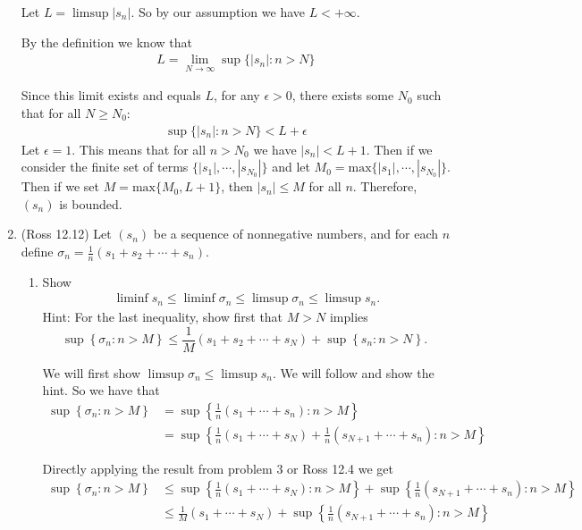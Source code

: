 \documentclass [10pt]{article}
\newcommand{\jg}[1]{{\color{blue} #1}}
\begin{document}
\begin{enumerate}
{Let $L = \limsup |s_n|$. So by our assumption we have $L < + \infty$. 

By the definition we know that
\begin{align*}
L = \lim_{N \rightarrow \infty} \sup \{ |s_n| : n > N \}
\end{align*}

Since this limit exists and equals $L$, for any $\epsilon > 0$, there exists some $N_0$ such that for all $N \geq N_0$: 
\begin{align*}
    \sup \{|s_n| : n > N \} < L + \epsilon
\end{align*}
Let $\epsilon = 1$. This means that for all $n > N_0$ we have $|s_n| < L+1$. Then if we consider the finite set of terms $\{ |s_1|, \cdots, |s_{N_0}|\}$ and let $M_0 = \text{max}\{ |s_1|, \cdots, |s_{N_0}|\}$. Then if we set $M = \text{max} \{M_0, L+1\}$, then $|s_n| \leq M$ for all $n$. Therefore, $(s_n)$ is bounded. 

}

\clearpage
\item (Ross 12.12) Let $\left(s_n\right)$ be a sequence of nonnegative numbers,
and for each $n$ define $\sigma_n=\frac{1}{n}\left(s_1+s_2+\cdots+s_n\right)$.
\begin{enumerate}
\item Show
\begin{align*}
\liminf s_n \leq \liminf \sigma_n \leq \limsup \sigma_n \leq \limsup s_n .
\end{align*}
Hint: For the last inequality, show first that $M>N$ implies
$$
\sup \left\{\sigma_n: n>M\right\} \leq \frac{1}{M}\left(s_1+s_2+\cdots+s_N\right)+\sup \left\{s_n: n>N\right\} \text {. }
$$

\jg{
We will first show $\limsup \sigma_n \leq \limsup s_n$. We will follow and show the hint. So we have that 
\begin{align*}
   \sup \left\{\sigma_n: n>M\right\} &= \sup \left\{ \frac{1}{n} (s_1 + \cdots + s_n) : n > M   \right\} \\
   &= \sup \left\{\frac{1}{n} (s_1 + \cdots + s_N) + \frac{1}{n} (s_{N+1} + \cdots + s_n) : n > M \right\} 
\end{align*}

Directly applying the result from problem 3 or Ross 12.4 we get 
\begin{align*}
   \sup \left\{\sigma_n: n>M\right\} & \leq \sup \left\{ \frac{1}{n} (s_1 + \cdots + s_N) : n > M \right\} + \sup \left\{ \frac{1}{n} (s_{N+1} + \cdots + s_n ) : n > M \right\} \\
   & \leq \frac{1}{M} (s_1 + \cdots + s_N) + \sup \left\{ \frac{1}{n} (s_{N+1} + \cdots + s_n ) : n > M \right\}
\end{align*}

}
\end{enumerate}
\end{enumerate}
\end{document}
